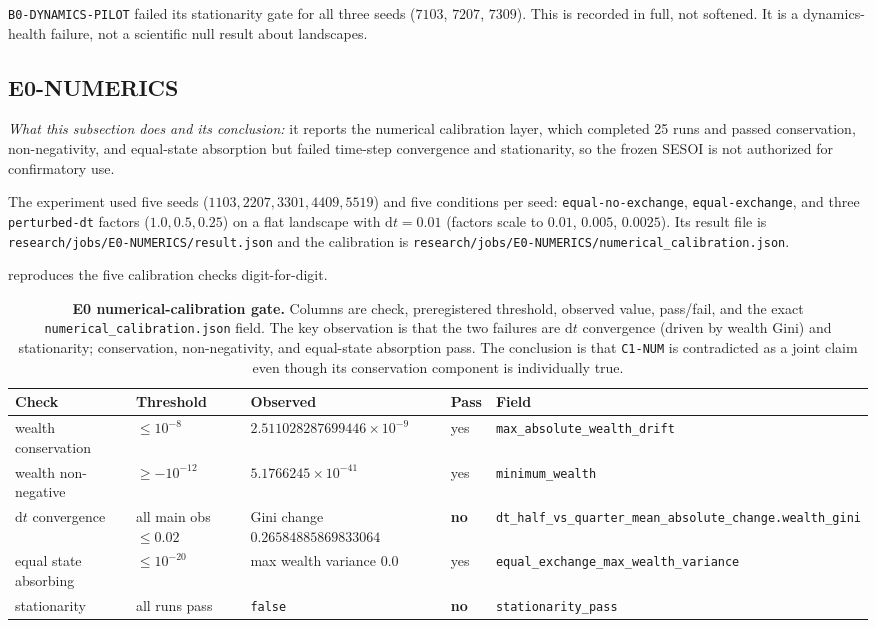 \documentclass[11pt,a4paper]{article}
\newcommand{\code}[1]{\texttt{#1}}
\begin{document}
\begin{warningbox}
\code{B0-DYNAMICS-PILOT} failed its stationarity gate for all three seeds
($7103$, $7207$, $7309$). This is recorded in full, not softened. It is a
dynamics-health failure, not a scientific null result about landscapes.
\end{warningbox}

\subsection{E0-NUMERICS}
\label{sec:e0}

\emph{What this subsection does and its conclusion:} it reports the numerical
calibration layer, which completed 25 runs and passed conservation,
non-negativity, and equal-state absorption but failed time-step convergence and
stationarity, so the frozen SESOI is not authorized for confirmatory use.

The experiment used five seeds ($1103,2207,3301,4409,5519$) and five conditions
per seed: \code{equal-no-exchange}, \code{equal-exchange}, and three
\code{perturbed-dt} factors ($1.0,0.5,0.25$) on a flat landscape with
$\mathrm{d}t=0.01$ (factors scale to $0.01$, $0.005$, $0.0025$). Its result file
is \code{research/jobs/E0-NUMERICS/result.json} and the calibration is
\code{research/jobs/E0-NUMERICS/numerical\_calibration.json}.

 reproduces the five calibration checks digit-for-digit.

\begin{table}[htbp]
\centering
\small
\begin{tabular}{@{}lp{1.7cm}p{2.9cm}p{1.0cm}p{3.5cm}@{}}
\toprule
\textbf{Check} & \textbf{Threshold} & \textbf{Observed} & \textbf{Pass} & \textbf{Field} \\
\midrule
wealth conservation & $\le 10^{-8}$ & $2.511028287699446\times10^{-9}$ & yes & \code{max\_absolute\_wealth\_drift} \\
wealth non-negative & $\ge -10^{-12}$ & $5.1766245\times10^{-41}$ & yes & \code{minimum\_wealth} \\
$\mathrm{d}t$ convergence & all main obs $\le 0.02$ & Gini change $0.26584885869833064$ & \textbf{no} & \code{dt\_half\_vs\_quarter\_mean\_absolute\_change.wealth\_gini} \\
equal state absorbing & $\le 10^{-20}$ & max wealth variance $0.0$ & yes & \code{equal\_exchange\_max\_wealth\_variance} \\
stationarity & all runs pass & \code{false} & \textbf{no} & \code{stationarity\_pass} \\
\bottomrule
\end{tabular}
\caption{\textbf{E0 numerical-calibration gate.} Columns are check, preregistered
threshold, observed value, pass/fail, and the exact \code{numerical\_calibration.json}
field. The key observation is that the two failures are $\mathrm{d}t$
convergence (driven by wealth Gini) and stationarity; conservation,
non-negativity, and equal-state absorption pass. The conclusion is that
\code{C1-NUM} is contradicted as a joint claim even though its conservation
component is individually true.}
\label{tab:e0-gate}
\end{table}
\end{document}
